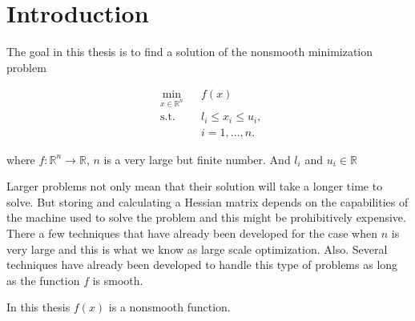 
\chapter{Introduction} %

\label{Chapter1} %


The goal in this thesis is to find a solution of the nonsmooth minimization problem

\begin{equation} \label{mainproblem}
  \begin{aligned}
    & \underset{x \in \mathbb{R}^n}{\text{min}}
    & & f(x) \\
    & \text{s.t.}
    & & l_i \leq x_i \leq u_i , \; \\
    & & & i = 1, \ldots, n.
  \end{aligned}
\end{equation}

where $f \colon \mathbb{R}^n \to \mathbb{R}$, $n$ is a very large but finite number. And $l_i$ and $u_i \in \mathbb{R}$

Larger problems not only mean that their solution will take a longer time to solve. But storing and calculating a Hessian matrix depends on the capabilities of the machine used to solve the problem and this might be prohibitively expensive. There a few techniques that have already been developed for the case when $n$ is very large and this is what we know as large scale optimization. Also. Several techniques have already been developed to handle this type of problems as long as the function $f$ is smooth. 

In this thesis $f(x)$ is a nonsmooth function.

